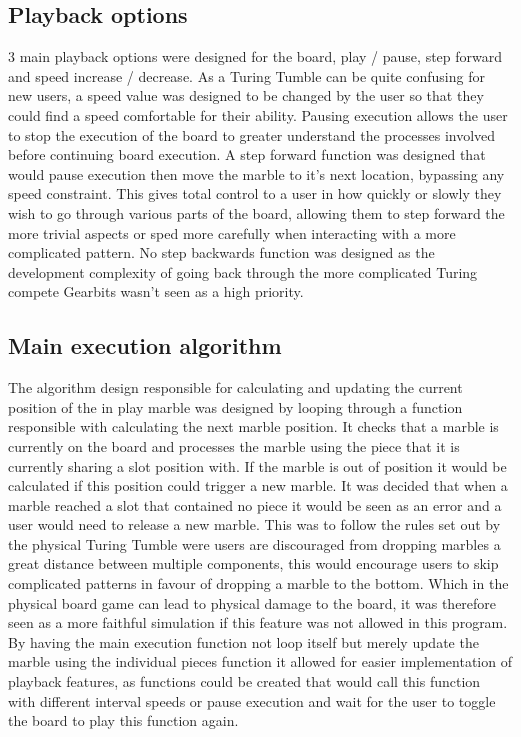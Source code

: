 \documentclass{l4proj}
\begin{document}
\subsection{Playback options}
3 main playback options were designed for the board, play / pause, step forward and speed increase / decrease. As a Turing Tumble can be quite confusing for new users, a speed value was designed to be changed by the user so that they could find a speed comfortable for their ability. Pausing execution allows the user to stop the execution of the board to greater understand the processes involved before continuing board execution. A step forward function was designed that would pause execution then move the marble to it's next location, bypassing any speed constraint. This gives total control to a user in how quickly or slowly they wish to go through various parts of the board, allowing them to step forward the more trivial aspects or sped more carefully when interacting with a more complicated pattern. No step backwards function was designed as the development complexity of going back through the more complicated Turing compete Gearbits wasn't seen as a high priority. 

\subsection{Main execution algorithm}
The algorithm design responsible for calculating and updating the current position of the in play marble was designed by looping through a function responsible with calculating the next marble position. It checks that a marble is currently on the board and processes the marble using the piece that it is currently sharing a slot position with. If the marble is out of position it would be calculated if this position could trigger a new marble. It was decided that when a marble reached a slot that contained no piece it would be seen as an error and a user would need to release a new marble. This was to follow the rules set out by the physical Turing Tumble were users are discouraged from dropping marbles a great distance between multiple components, this would encourage users to skip complicated patterns in favour of dropping a marble to the bottom. Which in the physical board game can lead to physical damage to the board, it was therefore seen as a more faithful simulation if this feature was not allowed in this program. By having the main execution function not loop itself but merely update the marble using the individual pieces function it allowed for easier implementation of playback features, as functions could be created that would call this function with different interval speeds or pause execution and wait for the user to toggle the board to play this function again.
\end{document}
